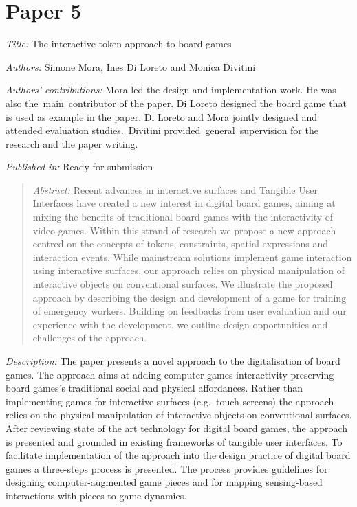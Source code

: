 \section[The interactive-token approach to board games]{Paper 5}\label{paper-5}

\emph{Title:} The interactive-token approach to board games

\emph{Authors:} Simone Mora, Ines Di Loreto and Monica Divitini

\emph{Authors' contributions:} Mora led the design and implementation work. He was also the~main~contributor of the paper. Di Loreto designed the board game that is used as example in the paper. Di Loreto and Mora jointly designed and attended evaluation studies.~Divitini provided~general~supervision for the research and the paper writing.

\emph{Published in:} Ready for submission
\begin{quote}
	\emph{Abstract:} Recent advances in interactive surfaces and Tangible User Interfaces have created a new interest in digital board games, aiming at mixing the benefits of traditional board games with the interactivity of video games. Within this strand of research we propose a new approach centred on the concepts of tokens, constraints, spatial expressions and interaction events. While mainstream solutions implement game interaction using interactive surfaces, our approach relies on physical manipulation of interactive objects on conventional surfaces. We illustrate the proposed approach by describing the design and development of a game for training of emergency workers. Building on feedbacks from user evaluation and our experience with the development, we outline design opportunities and challenges of the approach. 
\end{quote}

\emph{Description:} The paper presents a novel approach to the digitalisation of board games. The approach aims at adding computer games interactivity preserving board games's traditional social and physical affordances. Rather than implementing games for interactive surfaces (e.g.~touch-screens) the approach relies on the physical manipulation of interactive objects on conventional surfaces. After reviewing state of the art technology for digital board games, the approach is presented and grounded in existing frameworks of tangible user interfaces. To facilitate implementation of the approach into the design practice of digital board games a three-steps process is presented. The process provides guidelines for designing computer-augmented game pieces and for mapping sensing-based interactions with pieces to game dynamics.

